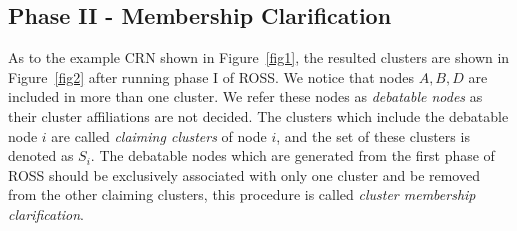 \documentclass[10pt,journal,compsoc]{IEEEtran}
\makeatletter
\theoremstyle{mytheoremstyle}
\theoremstyle{mytheoremstyle}
\theoremstyle{mytheoremstyle}
\renewenvironment{proof}[1][\proofname]{%
      \par\pushQED{\qed}\fontfamily{ptm}\selectfont%
      \topsep6\p@\@plus6\p@\relax
      \trivlist\item[\hskip\labelsep\bfseries#1\@addpunct{.}]%
      \ignorespaces
    }{%
      \popQED\endtrivlist\@endpefalse
    }
\makeatother
\begin{document}
\subsection{Phase II - Membership Clarification}
\label{membershipClarification}
As to the example CRN shown in Figure~\ref{fig1}, the resulted clusters are shown in Figure~\ref{fig2} after running phase I of ROSS.
We notice that nodes $A, B, D$ are included in more than one cluster. 
We refer these nodes as \textit{debatable nodes} as their cluster affiliations are not decided.
The clusters which include the debatable node $i$ are called \textit{claiming clusters} of node $i$, and the set of these clusters is denoted as $S_i$.  
The debatable nodes which are generated from the first phase of ROSS should be exclusively associated with only one cluster and be removed from the other claiming clusters, this procedure is called \textit{cluster membership clarification}.





%

\end{document}
